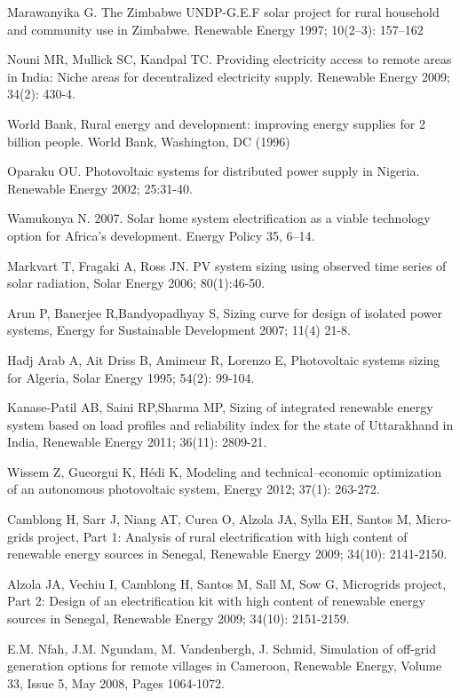 \documentclass[11p]{article}
\begin{document}
\begin{thebibliography}{9}

 Marawanyika G. The Zimbabwe UNDP-G.E.F solar project for rural household and community use in Zimbabwe. Renewable Energy 1997; 10(2–3): 157–162

 Nouni MR, Mullick SC, Kandpal TC. Providing electricity access to remote areas in India: Niche areas for decentralized electricity supply. Renewable Energy 2009; 34(2): 430-4.

 World Bank, Rural energy and development: improving energy supplies for 2 billion people. World Bank, Washington, DC (1996)

Oparaku OU. Photovoltaic systems for distributed power supply in Nigeria. Renewable Energy 2002; 25:31-40.

 Wamukonya N. 2007. Solar home system electrification as a viable technology option for Africa’s development. Energy Policy 35, 6–14.

 Markvart T, Fragaki A, Ross JN. PV system sizing using observed time series of solar radiation, Solar Energy 2006; 80(1):46-50.

 Arun P, Banerjee R,Bandyopadhyay S, Sizing curve for design of isolated power systems, Energy for Sustainable Development 2007; 11(4) 21-8.

 Hadj Arab A, Ait Driss B, Amimeur R, Lorenzo E, Photovoltaic systems sizing for Algeria, Solar Energy 1995; 54(2): 99-104.

 Kanase-Patil AB, Saini RP,Sharma MP, Sizing of integrated renewable energy system based on load profiles and reliability index for the state of Uttarakhand in India, Renewable Energy 2011; 36(11): 2809-21.

 Wissem Z, Gueorgui K, Hédi K, Modeling and technical–economic optimization of an autonomous photovoltaic system, Energy 2012; 37(1): 263-272.

 Camblong H, Sarr J, Niang AT, Curea O, Alzola JA, Sylla EH, Santos M, Micro-grids project, Part 1: Analysis of rural electrification with high content of renewable energy sources in Senegal, Renewable Energy 2009; 34(10): 2141-2150.

 Alzola JA, Vechiu I, Camblong H, Santos M, Sall M, Sow G, Microgrids project, Part 2: Design of an electrification kit with high content of renewable energy sources in Senegal, Renewable Energy 2009; 34(10):  2151-2159. 

 E.M. Nfah, J.M. Ngundam, M. Vandenbergh, J. Schmid, Simulation of off-grid generation options for remote villages in Cameroon, Renewable Energy, Volume 33, Issue 5, May 2008, Pages 1064-1072.


\end{thebibliography}
\end{document}
